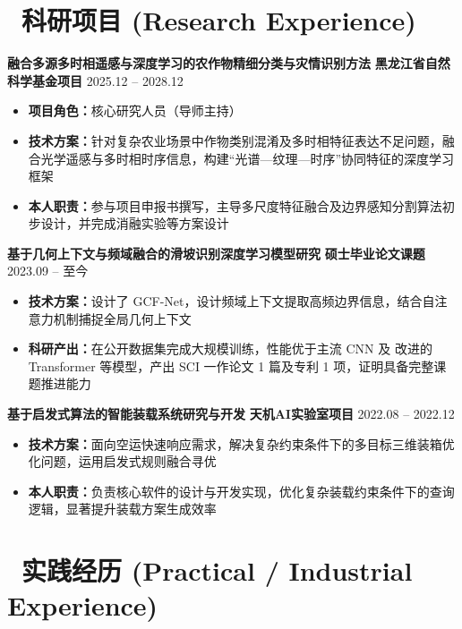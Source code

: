 \documentclass[9pt]{article}
\newlength{\interProjectSpacing}
\newcommand{\projectsep}{\vspace{\interProjectSpacing}}
\begin{document}
\section{\makebox[\widthof{\faFlask}][c]{\color{CVBlue}\faFlask}\ 科研项目 (Research Experience)}

\textbf{融合多源多时相遥感与深度学习的农作物精细分类与灾情识别方法} \hfill \textbf{\color{CVBlue}黑龙江省自然科学基金项目} \hfill 2025.12 -- 2028.12
\begin{itemize}[nosep, leftmargin=*]
    \item \textbf{项目角色：}核心研究人员（导师主持）
    \item \textbf{技术方案：}针对复杂农业场景中作物类别混淆及多时相特征表达不足问题，融合光学遥感与多时相时序信息，构建“光谱—纹理—时序”协同特征的深度学习框架
    \item \textbf{本人职责：}参与项目申报书撰写，主导多尺度特征融合及边界感知分割算法初步设计，并完成消融实验等方案设计
\end{itemize}

\projectsep

\textbf{基于几何上下文与频域融合的滑坡识别深度学习模型研究} \hfill \textbf{\color{CVBlue}硕士毕业论文课题} \hfill 2023.09 -- 至今
\begin{itemize}[nosep, leftmargin=*]
    \item \textbf{技术方案：}设计了 GCF-Net，设计频域上下文提取高频边界信息，结合自注意力机制捕捉全局几何上下文
    \item \textbf{科研产出：}在公开数据集完成大规模训练，性能优于主流 CNN 及 改进的Transformer 等模型，产出 SCI 一作论文 1 篇及专利 1 项，证明具备完整课题推进能力
\end{itemize}

\projectsep

\textbf{基于启发式算法的智能装载系统研究与开发} \hfill \textbf{\color{CVBlue}天机AI实验室项目} \hfill 2022.08 -- 2022.12
\begin{itemize}[nosep, leftmargin=*]
    \item \textbf{技术方案：}面向空运快速响应需求，解决复杂约束条件下的多目标三维装箱优化问题，运用启发式规则融合寻优
    \item \textbf{本人职责：}负责核心软件的设计与开发实现，优化复杂装载约束条件下的查询逻辑，显著提升装载方案生成效率
\end{itemize}


\section{\makebox[\widthof{\faBriefcase}][c]{\color{CVBlue}\faBriefcase}\ 实践经历 (Practical / Industrial Experience)}
\end{document}
